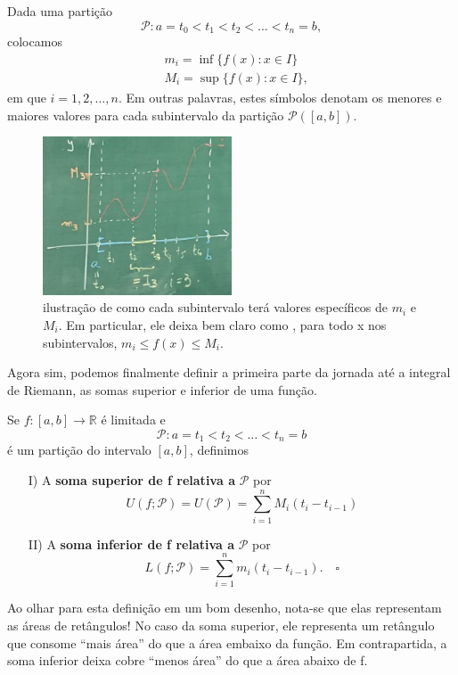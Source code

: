 \documentclass[../analysisII_notes.tex]{subfiles}
\begin{document}
Dada uma partição
\[
	\mathcal{P}: a = t_{0} < t_1 < t_2 <\dotsc <t_{n} = b,
\]
colocamos
\begin{align*}
	 & m_{i} = \inf_{}\{f(x):x\in I\}  \\
	 & M_{i} = \sup_{}\{f(x):x\in I\},
\end{align*}
em que \(i= 1, 2, \dotsc , n.\) Em outras palavras, estes símbolos denotam os menores e maiores valores para cada subintervalo da partição \(\mathcal{P}([a, b])\).
\begin{figure}[H]
	\begin{center}
		\includegraphics[height=0.5\textheight, width=0.5\textwidth, keepaspectratio]{./Images/supinf_partition_03.png}
	\end{center}
	\caption{ilustração de como cada subintervalo terá valores específicos de \(m_{i}\) e \(M_{i}\). Em particular, ele deixa bem claro como , para todo x nos subintervalos, \(m_{i}\leq f(x)\leq M_{i}\).}
	\label{supingf03}
\end{figure}

Agora sim, podemos finalmente definir a primeira parte da jornada até a integral de Riemann, as somas superior e inferior de uma função.
\begin{def*}
	Se \(f:[a, b]\rightarrow \mathbb{R}\) é limitada e
	\[
		\mathcal{P}: a = t_{1} < t_2 < \dotsc < t_{n} = b
	\]
	é um partição do intervalo \([a, b]\), definimos
	\begin{itemize}
		\item[I)] A \textbf{soma superior de f relativa a }\(\mathcal{P}\) por
		      \[
			      U(f; \mathcal{P}) = U(\mathcal{P}) = \sum\limits_{i=1}^{n}M_{i}(t_{i}-t_{i-1})
		      \]
		\item[II)] A \textbf{soma inferior de f relativa a }\(\mathcal{P}\) por
		      \[
			      L(f; \mathcal{P}) = \sum\limits_{i=1}^{n}m_{i}(t_{i}-t_{i-1}). \quad \square
		      \]
	\end{itemize}
\end{def*}
Ao olhar para esta definição em um bom desenho, nota-se que elas representam as áreas de retângulos!  No caso da soma superior, ele representa um retângulo que consome ``mais área'' do que a área embaixo da função. Em contrapartida, a soma inferior deixa cobre ``menos área'' do que a área abaixo de f.
\end{document}
